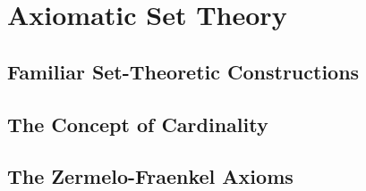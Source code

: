 \section{Axiomatic Set Theory}

\subsection{Familiar Set-Theoretic Constructions}


\subsection{The Concept of Cardinality}


\subsection{The Zermelo-Fraenkel Axioms}